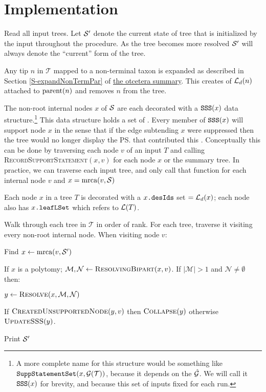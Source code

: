 \documentclass[11pt]{article}
\newcommand{\summDoc}{\href{http://phylo.bio.ku.edu/ot/summarizing-taxonomy-plus-trees.pdf}{the otcetera summary}\xspace}
\newcommand{\summRef}[1]{Section \ref{S-#1} of \summDoc}
\begin{document}
\section*{Implementation}
\begin{compactenum}
    \item Read all input trees. Let $\mathcal{S}^{\prime}$ denote the current state of tree that is initialized by the input
    \summaryTree throughout the procedure. 
    As the tree becomes more resolved $\mathcal{S}^{\prime}$ will always denote the ``current'' form of the tree.
    \item Any tip $n$ in $\mathcal{T}$ mapped to a non-terminal taxon is expanded as described in \summRef{expandNonTermPar}.
    This creates of $\mathcal{L}_d(n)$ attached to $\mbox{parent}(n)$ and removes $n$ from the tree.
    \item The non-root internal nodes $x$ of $\mathcal{S}$ are each decorated with a  $\mbox{\texttt{SSS}}(x)$ data structure.\footnote{A
    more complete name for this structure would be something like $\mbox{\texttt{SuppStatementSet}}(x, \mathcal{G}(\mathcal{T}))$,
    because it depends on the $\hat{\mathcal{G}}$.
    We will call it $\mbox{\texttt{SSS}}(x)$ for brevity, and because this set of inputs fixed for each run.}
    This data structure holds a set of  {\incLSSSs}.
    Every member of $\mbox{\texttt{SSS}}(x)$ will support node $x$ in the
    sense that if the edge subtending $x$ were suppressed then the tree would no longer 
    display the \ps that contributed this \incLSSS.
    Conceptually this can be done by traversing each node $v$ of an input $T$
    and calling \textsc{RecordSupportStatement}$(x, v)$ for each node $x$ or the summary tree.
    In practice, we can traverse each input tree, and only call that function for each internal node $v$ and $x=\mbox{mrca}(v, \mathcal{S})$
    \item Each node $x$ in a tree $T$ is decorated with a ${x}\texttt{.desIds}$ set $=\mathcal{L}_d(x)$;
    each node also has ${x}\texttt{.leafLSet}$ which refers to $\mathcal{L}(T)$.
    \item Walk through each tree in $\mathcal{T}$ in order of rank. For each tree, 
    traverse it visiting every non-root internal node.
    When visiting node $v$:
    \begin{compactenum}
        \item Find $x \leftarrow \mbox{mrca}(v, \mathcal{S}^{\prime})$
        \item If $x$ is a polytomy; $\mathcal{M}, \mathcal{N} \leftarrow \textsc{ResolvingBipart}(x, v)$. If $|\mathcal{M}| > 1$ and $\mathcal{N}\neq \emptyset$ then:
         \begin{compactenum}
            \item  $y\leftarrow \textsc{Resolve}(x, \mathcal{M}, \mathcal{N})$
            \item If $\textsc{CreatedUnsupportedNode}(y, v)$ then $\textsc{Collapse}(y)$ otherwise $\textsc{UpdateSSS}(y)$.
        \end{compactenum}
   \end{compactenum}
   \item Print $\mathcal{S}^{\prime}$
\end{compactenum}
\end{document}
